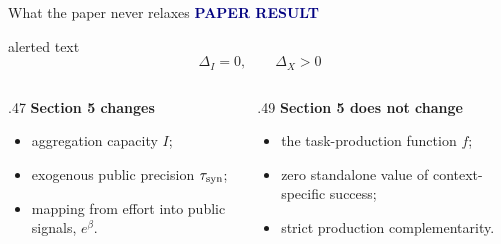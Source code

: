 \documentclass[aspectratio=169,10pt]{beamer}
\newcommand{\paperlabel}{\textcolor{Navy}{\scriptsize\bfseries PAPER RESULT}}
\begin{document}
\begin{frame}{What the paper never relaxes}
  \paperlabel
  \vspace{.2cm}
  \begin{beamercolorbox}[rounded=true,sep=1em]{alerted text}
    \centering\Large
    \[\boxed{\Delta_I=0,\qquad\Delta_X>0}\]
  \end{beamercolorbox}

  \vspace{.45cm}
  \begin{columns}[T,onlytextwidth]
    \begin{column}{.47\textwidth}
      \textbf{Section 5 changes}
      \begin{itemize}\small
        \item aggregation capacity $I$;
        \item exogenous public precision $\tau_{\rm syn}$;
        \item mapping from effort into public signals, $e^\beta$.
      \end{itemize}
    \end{column}
    \begin{column}{.49\textwidth}
      \textbf{Section 5 does not change}
      \begin{itemize}\small
        \item the task-production function $f$;
        \item zero standalone value of context-specific success;
        \item strict production complementarity.
      \end{itemize}
    \end{column}
  \end{columns}

  \vspace{.25cm}
\end{frame}
\end{document}
